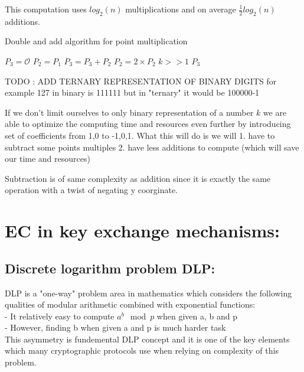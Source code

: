 \documentclass[bp,en]{FEIstyle}
\begin{document}
This computation uses $log_2(n)$ multiplications and on average $\frac{1}{2}log_2(n)$ additions. 


\newpage

\begin{algorithm}
\caption{Double and add algorithm for point multiplication }  
\label{alg:double-and-add-safer}                         
\begin{algorithmic}[1]                    
    \STATE $P_3 = \mathcal{O}$
    \STATE $P_2 = P_1$ 
            \STATE $P_3= P_3 + P_2$ 
        \ENDIF
        \STATE $P_2 = 2 \times P_2$ 
        \STATE $k >> 1$
    \ENDWHILE
    \RETURN $P_3$
\end{algorithmic}
\end{algorithm}



TODO : ADD TERNARY REPRESENTATION OF BINARY DIGITS
for example 127 in binary is 111111 but in "ternary" it would be 100000-1

If we don't limit ourselves to only binary representation of a number $k$ we are able to optimize the computing time and resources even further by introducing set of coefficients from {1,0} to {-1,0,1}. What this will do is we will 
1. have to subtract some points multiples 
2. have less additions to compute (which will save our time and resources)

Subtraction is of same complexity as addition since it is exactly the same operation with a twist of negating y coorginate. 

\newpage

\section*{EC in key exchange mechanisms:}

\subsection*{Discrete logarithm problem DLP:}

DLP is a "one-way" problem area in mathematics which considers the following qualities of modular arithmetic combined with exponential functions:\\
- It relatively easy to compute $a^b \mod{p}$ when given a, b and p\\
- However, finding b when given a and p is much harder task\\ 
This asymmetry is fundemental DLP concept and it is one of the key 
elements which many cryptographic protocols use when relying on complexity of this problem.
\end{document}
